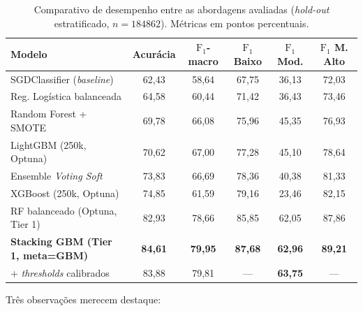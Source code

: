\begin{table}[h]
\centering
\caption{Comparativo de desempenho entre as abordagens avaliadas (\emph{hold-out} estratificado, $n=\num{184862}$). Métricas em pontos percentuais.}
\label{tab:res_comparativo}
\small
\begin{tabular}{lccccc}
\toprule
\textbf{Modelo} & \textbf{Acurácia} & \textbf{$\text{F}_1$-macro} & \textbf{$\text{F}_1$ Baixo} & \textbf{$\text{F}_1$ Mod.} & \textbf{$\text{F}_1$ M. Alto} \\
\midrule
SGDClassifier (\emph{baseline}) & 62,43 & 58,64 & 67,75 & 36,13 & 72,03 \\
Reg. Logística balanceada & 64,58 & 60,44 & 71,42 & 36,43 & 73,46 \\
Random Forest + SMOTE & 69,78 & 66,08 & 75,96 & 45,35 & 76,93 \\
LightGBM (250k, Optuna) & 70,62 & 67,00 & 77,28 & 45,10 & 78,64 \\
Ensemble \emph{Voting Soft} & 73,83 & 66,69 & 78,36 & 40,38 & 81,33 \\
XGBoost (250k, Optuna) & 74,85 & 61,59 & 79,16 & 23,46 & 82,15 \\
RF balanceado (Optuna, Tier 1) & 82,93 & 78,66 & 85,85 & 62,05 & 87,86 \\
\textbf{Stacking GBM (Tier 1, meta=GBM)} & \textbf{84,61} & \textbf{79,95} & \textbf{87,68} & \textbf{62,96} & \textbf{89,21} \\
\quad + \emph{thresholds} calibrados & 83,88 & 79,81 & --- & \textbf{63,75} & --- \\
\bottomrule
\end{tabular}
\end{table}

Três observações merecem destaque:

